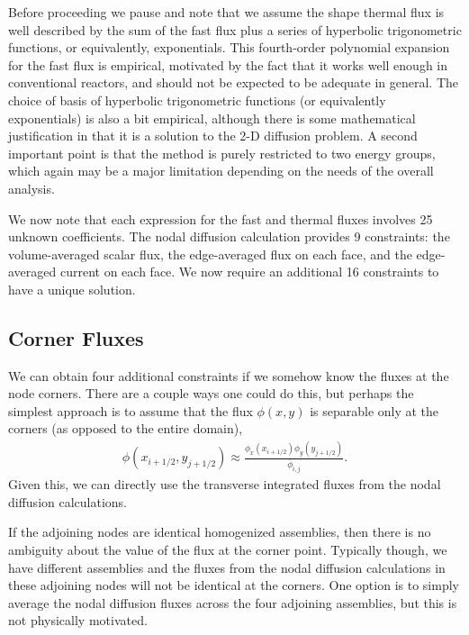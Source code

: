 Before proceeding we pause and note that we assume the shape thermal flux is well described by the sum of the fast flux plus a series of hyperbolic trigonometric functions, or equivalently, exponentials. This fourth-order polynomial expansion for the fast flux is empirical, motivated by the fact that it works well enough in conventional reactors, and should not be expected to be adequate in general. The choice of basis of hyperbolic trigonometric functions (or equivalently exponentials) is also a bit empirical, although there is some mathematical justification in that it is a solution to the 2-D diffusion problem. A second important point is that the method is purely restricted to two energy groups, which again may be a major limitation depending on the needs of the overall analysis.

We now note that each expression for the fast and thermal fluxes involves 25 unknown coefficients. The nodal diffusion calculation provides 9 constraints: the volume-averaged scalar flux, the edge-averaged flux on each face, and the edge-averaged current on each face. We now require an additional 16 constraints to have a unique solution.



\subsection{Corner Fluxes}

We can obtain four additional constraints if we somehow know the fluxes at the node corners. There are a couple ways one could do this, but perhaps the simplest approach is to assume that the flux $\phi(x,y)$ is separable only at the corners (as opposed to the entire domain), 
\begin{align}
  \phi(x_{i+1/2},y_{j+1/2}) \approx \frac{ \phi_x(x_{i+1/2}) \phi_y(y_{j+1/2}) }{ \overline{\phi}_{i,j} } .
\end{align}
Given this, we can directly use the transverse integrated fluxes from the nodal diffusion calculations.

If the adjoining nodes are identical homogenized assemblies, then there is no ambiguity about the value of the flux at the corner point. Typically though, we have different assemblies and the fluxes from the nodal diffusion calculations in these adjoining nodes will not be identical at the corners. One option is to simply average the nodal diffusion fluxes across the four adjoining assemblies, but this is not physically motivated. 

